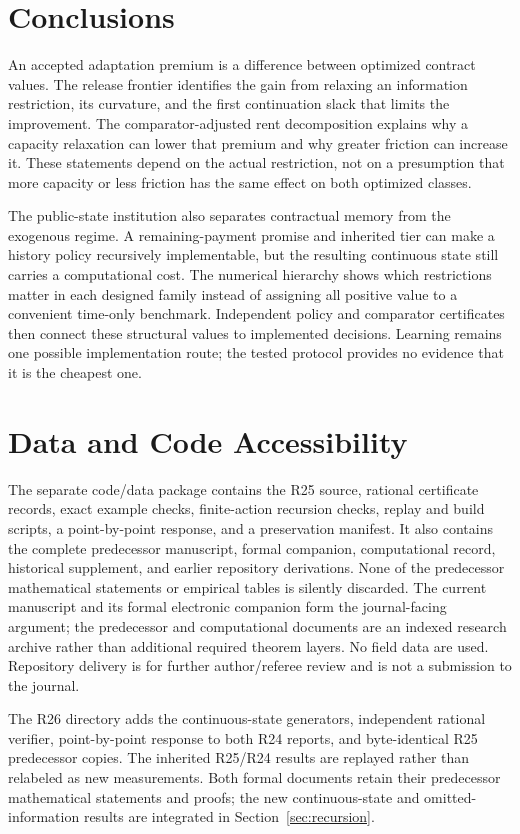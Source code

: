 \documentclass[11pt,letterpaper]{article}
\theoremstyle{definition}\newtheorem{assumption}[theorem]{Assumption}
\begin{document}
\section{Conclusions}
An accepted adaptation premium is a difference between optimized contract values. The release frontier identifies the gain from relaxing an information restriction, its curvature, and the first continuation slack that limits the improvement. The comparator-adjusted rent decomposition explains why a capacity relaxation can lower that premium and why greater friction can increase it. These statements depend on the actual restriction, not on a presumption that more capacity or less friction has the same effect on both optimized classes.

The public-state institution also separates contractual memory from the exogenous regime. A remaining-payment promise and inherited tier can make a history policy recursively implementable, but the resulting continuous state still carries a computational cost. The numerical hierarchy shows which restrictions matter in each designed family instead of assigning all positive value to a convenient time-only benchmark. Independent policy and comparator certificates then connect these structural values to implemented decisions. Learning remains one possible implementation route; the tested protocol provides no evidence that it is the cheapest one.

\section*{Data and Code Accessibility}
The separate code/data package contains the R25 source, rational certificate records, exact example checks, finite-action recursion checks, replay and build scripts, a point-by-point response, and a preservation manifest. It also contains the complete predecessor manuscript, formal companion, computational record, historical supplement, and earlier repository derivations. None of the predecessor mathematical statements or empirical tables is silently discarded. The current manuscript and its formal electronic companion form the journal-facing argument; the predecessor and computational documents are an indexed research archive rather than additional required theorem layers. No field data are used. Repository delivery is for further author/referee review and is not a submission to the journal.

The R26 directory adds the continuous-state generators, independent rational verifier, point-by-point response to both R24 reports, and byte-identical R25 predecessor copies. The inherited R25/R24 results are replayed rather than relabeled as new measurements. Both formal documents retain their predecessor mathematical statements and proofs; the new continuous-state and omitted-information results are integrated in Section~\ref{sec:recursion}.


\end{document}
